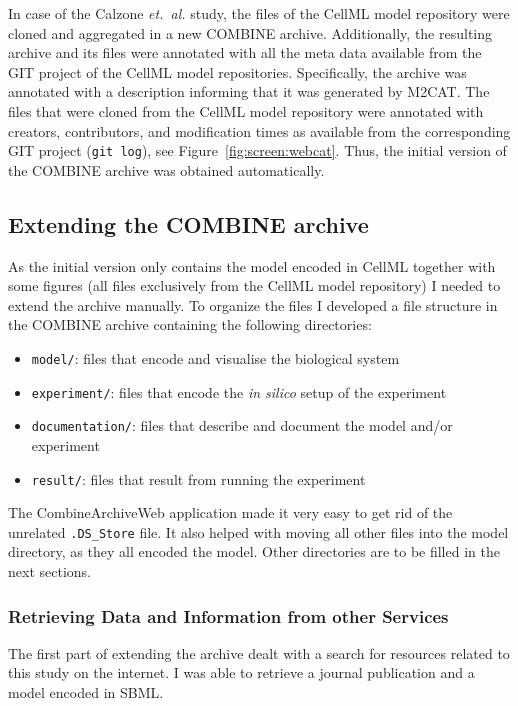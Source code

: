 In case of the Calzone \emph{et.~al.} study, the files of the CellML model repository were cloned and aggregated in a new COMBINE archive.
Additionally, the resulting archive and its files were annotated with all the meta data available from the GIT project of the CellML model repositories.
Specifically, the archive was annotated with a description informing that it was generated by M2CAT.
The files that were cloned from the CellML model repository were annotated with creators, contributors, and modification times as available from the corresponding GIT project (\texttt{git log}), see Figure~\ref{fig:screen:webcat}.
Thus, the initial version of the COMBINE archive was obtained automatically.






\subsection{Extending the COMBINE archive}
\label{sec:extendingarchive}
As the initial version only contains the model encoded in CellML together with some figures (all files exclusively from the CellML model repository) I needed to extend the archive manually.
To organize the files I developed a file structure in the COMBINE archive containing the following directories:
\begin{itemize}
 \item \texttt{model/}: files that encode and visualise the biological system
 \item \texttt{experiment/}: files that encode the \textit{in silico} setup of the experiment
 \item \texttt{documentation/}: files that describe and document the model and/or experiment
 \item \texttt{result/}: files that result from running the experiment
\end{itemize}

The CombineArchiveWeb application made it very easy to get rid of the unrelated \texttt{.DS\_Store} file. 
It also helped with moving all other files into the model directory, as they all encoded the model. 
Other directories are to be filled in the next sections.

\subsubsection{Retrieving Data and Information from other Services}
The first part of extending the archive dealt with a search for resources related to this study on the internet.
I was able to retrieve a journal publication and a model encoded in SBML.

